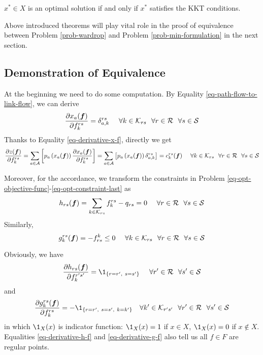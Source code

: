 \documentclass{article}
\begin{document}
\begin{theo}  \label{theo-kkt-for-convex}
    $ x^* \in X $ is an optimal solution if and only if $ x^* $ satisfies the KKT conditions.
\end{theo}

Above introduced theorems will play vital role in the proof of equivalence between Problem \ref{prob-wardrop} and Problem \ref{prob-min-formulation} in the next section.

\subsection{Demonstration of Equivalence}

At the beginning we need to do some computation. By Equality \ref{eq-path-flow-to-link-flow}, we can derive
\begin{equation} \label{eq-derivative-x-f}
    \frac{\partial x_a (\boldsymbol{f})}{\partial f^{rs}_k} = \delta^{rs}_{a, k} ~~~~ \forall k \in \mathcal{K}_{rs} ~~ \forall r \in \mathcal{R} ~~ \forall s \in \mathcal{S}
\end{equation}
Thanks to Equality \ref{eq-derivative-x-f}, directly we get
\begin{equation} \label{eq-derivative-z-f}
    \frac{\partial z (\boldsymbol{f})}{\partial f_k^{rs}} = \sum_{a \in \mathcal{A}} \left[ p_a \left(x_a (\boldsymbol{f})\right) \frac{\partial x_a (\boldsymbol{f})}{\partial f_k^{rs}} \right] = \sum_{a \in \mathcal{A}} \left[ p_a \left(x_a (\boldsymbol{f})\right) \delta_{a, k}^{rs} \right] = c_k^{rs} (\boldsymbol{f}) ~~~~ \forall k \in \mathcal{K}_{rs} ~~ \forall r \in \mathcal{R} ~~ \forall s \in \mathcal{S}
\end{equation}

Moreover, for the accordance, we transform the constraints in Problem \ref{eq-opt-objective-func}-\ref{eq-opt-constraint-last} as
\begin{equation}
    h_{rs} (\boldsymbol{f}) = \sum_{k \in \mathcal{K}_{rs}} f_k^{rs} - q_{rs} = 0 ~~~~ \forall r \in \mathcal{R} ~~ \forall s \in \mathcal{S} 
\end{equation}
Similarly, 
\begin{equation}
    g^{rs}_k (\boldsymbol{f}) = - f_{rs}^k \le 0 ~~~~ \forall k \in \mathcal{K}_{rs} ~~ \forall r \in \mathcal{R} ~~ \forall s \in \mathcal{S}
\end{equation}

Obviously, we have
\begin{equation} \label{eq-derivative-h-f}
    \frac{\partial h_{rs} (\boldsymbol{f})}{\partial f_{k}^{r's'}} = \1_{\{ r = r', ~s = s' \}} ~~~~ \forall r' \in \cR ~~ \forall s' \in \cS
\end{equation}
and
\begin{equation} \label{eq-derivative-g-f}
    \frac{\partial g_k^{rs} (\boldsymbol{f})}{\partial f_k^{rs}} = - \1_{\{r=r', ~s=s', ~k=k'\}} ~~~ \forall k' \in \cK_{r's'} ~~ \forall r' \in \cR ~~ \forall s' \in \cS
\end{equation}
in which $ \1_X (x) $ is indicator function: $ \1_X (x) = 1 $ if $ x \in X $, $ \1_X (x) = 0 $ if $ x \notin X $. Equalities \ref{eq-derivative-h-f} and \ref{eq-derivative-g-f} also tell us all $ f \in F $ are regular points.
\end{document}
